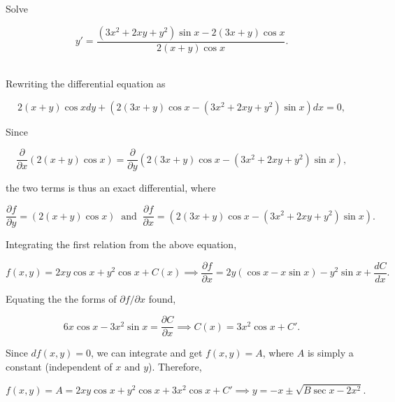 \documentclass[english,a4paper,12pt]{report}
\begin{document}
{Solve 

\begin{equation}
    y' = \frac{(3x^2+2xy+y^2)\sin x-2(3x+y)\cos x}{2(x+y)\cos x} .
\end{equation}~}
{Rewriting the differential equation as

\begin{equation}
    2(x+y)\cos xdy+(2(3x+y)\cos x-(3x^2+2xy+y^2)\sin x)dx = 0,
\end{equation}

Since

\begin{equation}
    \frac{\partial }{\partial x} (2(x+y)\cos x) = \frac{\partial }{\partial y} (2(3x+y)\cos x-(3x^2+2xy+y^2)\sin x),
\end{equation}

the two terms is thus an exact differential, where

\begin{equation}
    \frac{\partial f}{\partial y} = (2(x+y)\cos x) ~\text { and }~ \frac{\partial f}{\partial x} = (2(3x+y)\cos x-(3x^2+2xy+y^2)\sin x).
\end{equation}

Integrating the first relation from the above equation,

\begin{equation}
    f(x,y) = 2xy\cos x + y^2\cos x + C(x) \implies \frac{\partial f}{\partial x} = 2y(\cos x-x\sin x)-y^2\sin x+\frac{dC}{dx} .
\end{equation}

Equating the the forms of \(\partial f /\partial x \) found, 

\begin{equation}
    6x\cos x-3x^2\sin x = \frac{\partial C}{\partial x} \implies C(x) = 3x^2\cos x+ C'.
\end{equation}

Since \(df(x,y) = 0\), we can integrate and get \(f(x,y) = A\), where \(A\) is simply a constant (independent of \(x \text { and } y\)). Therefore, 

\begin{equation}
    f(x,y) = A = 2xy\cos x+y^2\cos x+3x^2\cos x+C' \implies y = -x \pm \sqrt{B \sec x - 2x^2}. 
\end{equation}~
} 
\end{document}
